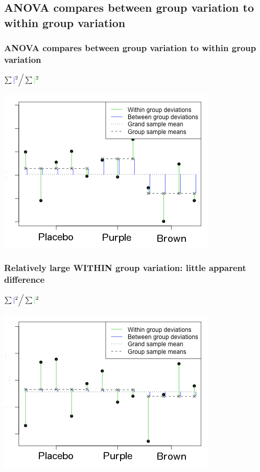 \documentclass[slidestop,compress,mathserif,12pt,t,professionalfonts,xcolor=table]{beamer}
\begin{document}

\subsection{ANOVA compares between group variation to within group variation}
\label{mi3}


\begin{frame}
  \frametitle{ANOVA compares between group variation to within group variation}

\centering
\(
\sum {\color{blue} \mid}^2 \Big/ \sum {\color{green} \mid}^2
\)

  \includegraphics[scale=0.6]{figures/anova-middle-ground-jelly-bean.png}

\end{frame}

\begin{frame}
\frametitle{Relatively large WITHIN group variation: little apparent difference}

\centering
\(
\sum {\color{blue} \mid}^2 \Big/ \sum {\color{green} \mid}^2
\)

    \includegraphics[scale=0.6]{Figures/anova-lots-of-within-group-jelly-bean.png}

\end{frame}
\end{document}
